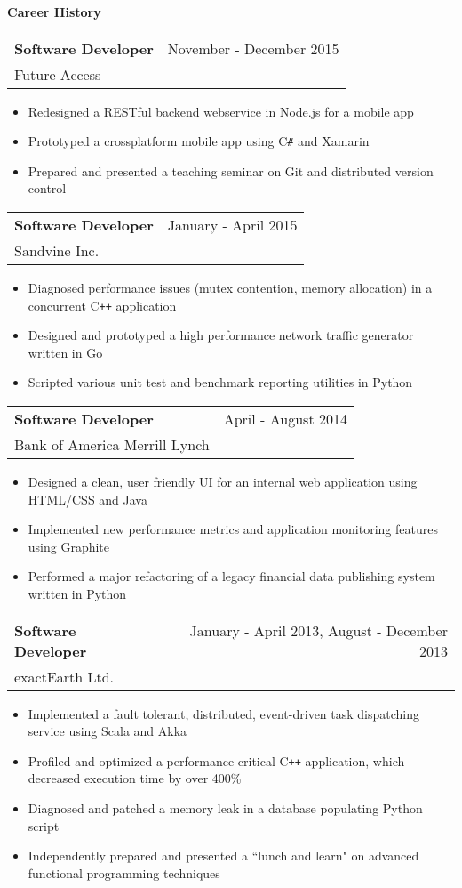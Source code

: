 \documentclass[10pt]{article}
\makeatletter
\newcommand{\resheading}[1]{{\large \colorbox{headercol}{\begin{minipage}{\textwidth}{\textbf{#1 \vphantom{p\^{E}}}}\end{minipage}}}}
\newcommand{\ressubheading}[3]{\item
\begin{tabular*}{7in}{l@{\extracolsep{\fill}}r}
    \textbf{#1} & #2 \\ #3
\end{tabular*}\vspace{-4pt}}
\makeatother
\begin{document}
\resheading{Career History}
\begin{description}
    \ressubheading{Software Developer} {November - December 2015} {Future Access}
    \begin{itemize}
        \item{Redesigned a RESTful backend webservice in Node.js for a mobile app}
        \item{Prototyped a crossplatform mobile app using C\texttt{\#} and Xamarin}
        \item{Prepared and presented a teaching seminar on Git and distributed version control}
    \end{itemize}

    \ressubheading{Software Developer} {January - April 2015} {Sandvine Inc.}
    \begin{itemize}
        \item{Diagnosed performance issues (mutex contention, memory allocation) in a concurrent C\texttt{++} application}
        \item{Designed and prototyped a high performance network traffic generator written in Go}
        \item{Scripted various unit test and benchmark reporting utilities in Python}
    \end{itemize}

    \ressubheading{Software Developer} {April - August 2014} {Bank of America Merrill Lynch}
    \begin{itemize}
        \item{Designed a clean, user friendly UI for an internal web application using HTML/CSS and Java}
        \item{Implemented new performance metrics and application monitoring features using Graphite}
        \item{Performed a major refactoring of a legacy financial data publishing system written in Python}
    \end{itemize}

    \ressubheading{Software Developer} {January - April 2013, August - December 2013} {exactEarth Ltd.}
    \begin{itemize}
        \item{Implemented a fault tolerant, distributed, event-driven task dispatching service using Scala and Akka}
        \item{Profiled and optimized a performance critical C\texttt{++} application, which decreased execution time by over 400\%}
        \item{Diagnosed and patched a memory leak in a database populating Python script}
        \item{Independently prepared and presented a ``lunch and learn" on advanced functional programming techniques}
    \end{itemize}


\end{description}
\end{document}
